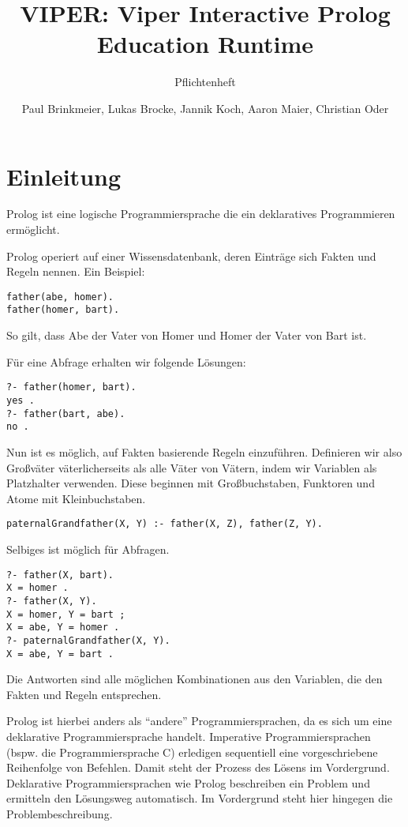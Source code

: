 \documentclass[parskip=full,11pt,twoside]{scrartcl}
\title{VIPER: Viper Interactive Prolog Education Runtime}
\subtitle{Pflichtenheft}
\author{Paul Brinkmeier, Lukas Brocke, Jannik Koch, Aaron Maier, Christian Oder}
\begin{document}
\maketitle

\section{Einleitung}

Prolog ist eine logische Programmiersprache die ein deklaratives Programmieren ermöglicht.

Prolog operiert auf einer Wissensdatenbank, deren Einträge sich Fakten und Regeln nennen. Ein Beispiel:

\begin{lstlisting}
father(abe, homer).
father(homer, bart).
\end{lstlisting}

So gilt, dass Abe der Vater von Homer und Homer der Vater von Bart ist.

Für eine Abfrage erhalten wir folgende Lösungen:

\begin{lstlisting}
?- father(homer, bart).
yes .
?- father(bart, abe).
no .
\end{lstlisting}

Nun ist es möglich, auf Fakten basierende Regeln einzuführen. Definieren wir also Großväter väterlicherseits als alle Väter von Vätern, indem wir Variablen als Platzhalter verwenden. Diese beginnen mit Großbuchstaben, Funktoren und Atome mit Kleinbuchstaben.

\begin{lstlisting}
paternalGrandfather(X, Y) :- father(X, Z), father(Z, Y).
\end{lstlisting}

Selbiges ist möglich für Abfragen.

\begin{lstlisting}
?- father(X, bart).
X = homer .
?- father(X, Y).
X = homer, Y = bart ;
X = abe, Y = homer .
?- paternalGrandfather(X, Y).
X = abe, Y = bart .
\end{lstlisting}

Die Antworten sind alle möglichen Kombinationen aus den Variablen, die den Fakten und Regeln entsprechen.

Prolog ist hierbei anders als \enquote{andere} Programmiersprachen, da es sich um eine deklarative Programmiersprache handelt. Imperative Programmiersprachen (bspw. die Programmiersprache C) erledigen sequentiell eine vorgeschriebene Reihenfolge von Befehlen. Damit steht der Prozess des Lösens im Vordergrund. Deklarative Programmiersprachen wie Prolog beschreiben ein Problem und ermitteln den Lösungsweg automatisch. Im Vordergrund steht hier hingegen die Problembeschreibung.
\end{document}
